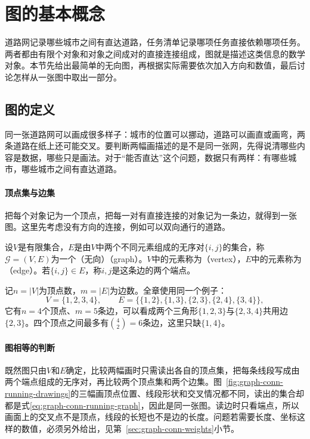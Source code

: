 \section{图的基本概念}
\label{sec:graph-basic-concepts}

道路网记录哪些城市之间有直达道路，任务清单记录哪项任务直接依赖哪项任务。两者都由有限个对象和对象之间成对的直接连接组成，图就是描述这类信息的数学对象。本节先给出最简单的无向图，再根据实际需要依次加入方向和数值，最后讨论怎样从一张图中取出一部分。

\subsection{图的定义}
\label{sec:graph-conn-definition}

同一张道路网可以画成很多样子：城市的位置可以挪动，道路可以画直或画弯，两条道路在纸上还可能交叉。要判断两幅画描述的是不是同一张网，先得说清哪些内容是数据，哪些只是画法。对于“能否直达”这个问题，数据只有两样：有哪些城市，哪些城市之间有直达道路。

\paragraph{顶点集与边集}
把每个对象记为一个顶点，把每一对有直接连接的对象记为一条边，就得到一张图。这里先考虑没有方向的连接，例如可以双向通行的道路。

\begin{definition}[图]
\label{def:graph-conn-graph}
设$V$是有限集合，$E$是由$V$中两个不同元素组成的无序对$\{i,j\}$的集合，称$\mathcal G=(V,E)$为一个（无向）（graph）。$V$中的元素称为（vertex），$E$中的元素称为（edge）。若$\{i,j\}\in E$，称$i,j$是这条边的两个端点。
\end{definition}

记$n=|V|$为顶点数，$m=|E|$为边数。全章使用同一个例子：
\begin{equation}
V=\{1,2,3,4\},\qquad
E=\bigl\{\{1,2\},\{1,3\},\{2,3\},\{2,4\},\{3,4\}\bigr\},
\label{eq:graph-conn-running-graph}
\end{equation}
它有$n=4$个顶点、$m=5$条边，可以看成两个三角形$\{1,2,3\}$与$\{2,3,4\}$共用边$\{2,3\}$。四个顶点之间最多有$\binom42=6$条边，这里只缺$\{1,4\}$。

\paragraph{图相等的判断}
既然图只由$V$和$E$确定，比较两幅画时只需读出各自的顶点集，把每条线段写成由两个端点组成的无序对，再比较两个顶点集和两个边集。图~\ref{fig:graph-conn-running-drawings}的三幅画顶点位置、线段形状和交叉情况都不同，读出的集合却都是式\eqref{eq:graph-conn-running-graph}，因此是同一张图。读边时只看端点，所以画面上的交叉点不是顶点，线段的长短也不是边的长度。问题若需要长度、坐标这样的数值，必须另外给出，见第~\ref{sec:graph-conn-weights}小节。

